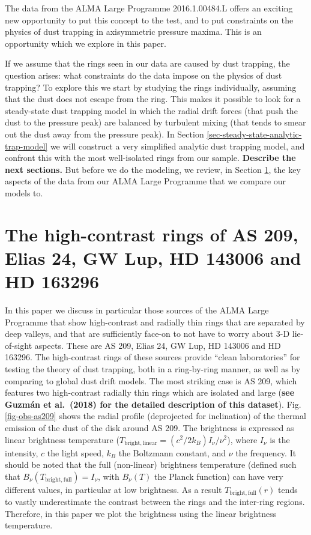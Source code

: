 \documentclass{aa}
\begin{document}
The data from the ALMA Large Programme 2016.1.00484.L offers an exciting new
opportunity to put this concept to the test, and to put constraints on the
physics of dust trapping in axisymmetric pressure maxima. This is an opportunity
which we explore in this paper.

If we assume that the rings seen in our data are caused by dust trapping, the
question arises: what constraints do the data impose on the physics of dust
trapping? To explore this we start by studying the rings individually, assuming
that the dust does not escape from the ring. This makes it possible to look for
a steady-state dust trapping model in which the radial drift forces (that push
the dust to the pressure peak) are balanced by turbulent mixing (that tends to
smear out the dust away from the pressure peak). In Section
\ref{sec-steady-state-analytic-trap-model} we will construct a very simplified
analytic dust trapping model, and confront this with the most well-isolated
rings from our sample. {\bf Describe the next sections.} But before we do the
modeling, we review, in Section \ref{sec-data}, the key aspects of the data from
our ALMA Large Programme that we compare our models to.



\section{The high-contrast rings of AS 209, Elias 24, GW Lup, HD 143006 and HD 163296}
\label{sec-data}
%
In this paper we discuss in particular those sources of the ALMA Large Programme
that show high-contrast and radially thin rings that are separated by deep
valleys, and that are sufficiently face-on to not have to worry about 3-D
lie-of-sight aspects. These are AS 209, Elias 24, GW Lup, HD 143006 and HD
163296. The high-contrast rings of these sources provide ``clean laboratories''
for testing the theory of dust trapping, both in a ring-by-ring manner, as well
as by comparing to global dust drift models. The most striking case is AS 209,
which features two high-contrast radially thin rings which are isolated and
large ({\bf see Guzm\'an et al.~(2018) for the detailed description of this
  dataset}). Fig.\ref{fig-obs-as209} shows the radial profile (deprojected for
inclination) of the thermal emission of the dust of the disk around AS 209. The
brightness is expressed as linear brightness temperature
($T_{\mathrm{bright,linear}}=(c^2/2k_B)I_\nu/\nu^2$), where $I_\nu$ is the
intensity, $c$ the light speed, $k_B$ the Boltzmann constant, and $\nu$ the
frequency. It should be noted that the full (non-linear) brightness temperature
(defined such that $B_\nu(T_{\mathrm{bright,full}})=I_\nu$, with $B_\nu(T)$ the
Planck function) can have very different values, in particular at low
brightness. As a result $T_{\mathrm{bright,full}}(r)$ tends to vastly
underestimate the contrast between the rings and the inter-ring
regions. Therefore, in this paper we plot the brightness using the linear
brightness temperature.
\end{document}
